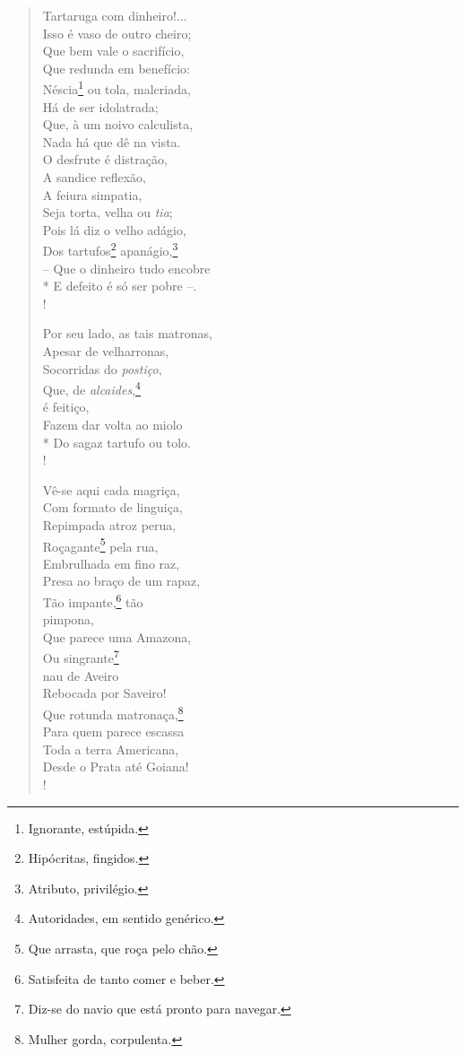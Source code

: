 \begin{verse}
Tartaruga com dinheiro!...\\
Isso é vaso de outro cheiro;\\
Que bem vale o sacrifício,\\
Que redunda em benefício:\\
Néscia\footnote{ Ignorante, estúpida.} ou tola, malcriada,\\
Há de ser idolatrada;\\
Que, à um noivo calculista,\\
Nada há que dê na vista.\\
O desfrute é distração,\\
A sandice reflexão,\\
A feiura simpatia,\\
Seja torta, velha ou \emph{tia};\\
Pois lá diz o velho adágio,\\
Dos tartufos\footnote{ Hipócritas, fingidos.} apanágio,\footnote{ Atributo, privilégio.}\\
-- Que o dinheiro tudo encobre\\*
E defeito é só ser pobre --.\\!

Por seu lado, as tais matronas,\\
Apesar de velharronas,\\
Socorridas do \emph{postiço},\\
Que, de \emph{alcaides},\footnote{ Autoridades, em sentido genérico.}\\
é feitiço,\\
Fazem dar volta ao miolo\\*
Do sagaz tartufo ou tolo.\\!

Vê-se aqui cada magriça,\\
Com formato de linguiça,\\
Repimpada atroz perua,\\
Roçagante\footnote{ Que arrasta, que roça pelo chão.} pela rua,\\
Embrulhada em fino raz,\\
Presa ao braço de um rapaz,\\
Tão impante,\footnote{ Satisfeita de tanto comer e beber.} tão\\
pimpona,\\
Que parece uma Amazona,\\
Ou singrante\footnote{ Diz-se do navio que está pronto para navegar.}\\
nau de Aveiro\\
Rebocada por Saveiro!\\
Que rotunda matronaça,\footnote{ Mulher gorda, corpulenta.}\\
Para quem parece escassa\\
Toda a terra Americana,\\
Desde o Prata até Goiana!\\!


\end{verse}
